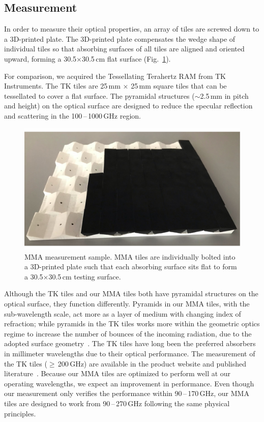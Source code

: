 \subsection{Measurement}

In order to measure their optical properties, an array of tiles are screwed down to a 3D-printed plate. The 3D-printed plate compensates the wedge shape of individual tiles so that absorbing surfaces of all tiles are aligned and oriented upward, forming a 30.5$\times$30.5\,cm flat surface (Fig.~\ref{fig:front_tiles}).

For comparison, we acquired the Tessellating Terahertz RAM from TK Instruments.  The TK tiles are 25\,mm $\times$ 25\,mm square tiles that can be tessellated to cover a flat surface. The pyramidal structures ($\sim$2.5\,mm in pitch and height) on the optical surface are designed to reduce the specular reflection and scattering in the 100\,--\,1000\,GHz region. 

\begin{figure}
    \centering
\includegraphics[width = .8\textwidth]{Figures/flat_sample.pdf}
    \caption{MMA measurement sample. MMA tiles are individually bolted into a 3D-printed plate such that each absorbing surface sits flat to form a 30.5$\times$30.5\,cm testing surface.}
    \label{fig:front_tiles}
\end{figure}

Although the TK tiles and our MMA tiles both have pyramidal structures on the optical surface, they function differently. Pyramids in our MMA tiles, with the sub-wavelength scale, act more as a layer of medium with changing index of refraction; while pyramids in the TK tiles works more within the geometric optics regime to increase the number of bounces of the incoming radiation, due to the adopted surface geometry~\cite{Chuss2017}. The TK tiles have long been the preferred absorbers in millimeter wavelengths due to their optical performance. The measurement of the TK tiles ($\geq$\,200\,GHz) are available in the product website and published literature~\cite{Saily/etal:2004}. Because our MMA tiles are optimized to perform well at our operating wavelengths, we expect an improvement in performance. Even though our measurement only verifies the performance within 90\,--\,170\,GHz, our MMA tiles are designed to work from 90\,--\,270\,GHz following the same physical principles.
